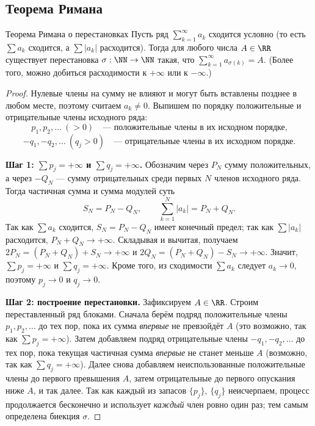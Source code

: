\subsection*{Теорема Римана}

\begin{Theorem}{Теорема Римана о перестановках}{}
	Пусть ряд $\sum_{k=1}^{\infty} a_k$ сходится условно (то есть $\sum a_k$
	сходится, а $\sum|a_k|$ расходится). Тогда для любого числа $A\in\RR$
	существует перестановка $\sigma:\NN\to\NN$ такая, что
	$\sum_{k=1}^{\infty} a_{\sigma(k)}=A$. (Более того, можно добиться
	расходимости к $+\infty$ или к $-\infty$.)
\end{Theorem}

\begin{proof}
	Нулевые члены на сумму не влияют и могут быть вставлены позднее в любом
	месте, поэтому считаем $a_k\ne0$. Выпишем по порядку положительные и
	отрицательные члены исходного ряда:
	\[
	p_1,p_2,\dots\ (>0)\quad\text{--- положительные члены в их исходном порядке,}
	\]
	\[
	-q_1,-q_2,\dots\ (q_j>0)\quad\text{--- отрицательные члены в их исходном порядке.}
	\]

	\textbf{Шаг 1: $\sum p_j=+\infty$ и $\sum q_j=+\infty$.} Обозначим через
	$P_N$ сумму положительных, а через $-Q_N$ --- сумму отрицательных среди
	первых $N$ членов исходного ряда. Тогда частичная сумма и сумма модулей
	суть
	\[
	S_N=P_N-Q_N,\qquad \sum_{k=1}^{N}|a_k|=P_N+Q_N.
	\]
	Так как $\sum a_k$ сходится, $S_N=P_N-Q_N$ имеет конечный предел; так как
	$\sum|a_k|$ расходится, $P_N+Q_N\to+\infty$. Складывая и вычитая, получаем
	$2P_N=(P_N+Q_N)+S_N\to+\infty$ и $2Q_N=(P_N+Q_N)-S_N\to+\infty$. Значит,
	$\sum p_j=+\infty$ и $\sum q_j=+\infty$. Кроме того, из сходимости $\sum a_k$
	следует $a_k\to0$, поэтому $p_j\to0$ и $q_j\to0$.

	\textbf{Шаг 2: построение перестановки.} Зафиксируем $A\in\RR$. Строим
	переставленный ряд блоками. Сначала берём подряд положительные члены
	$p_1,p_2,\dots$ до тех пор, пока их сумма \emph{впервые} не превзойдёт $A$
	(это возможно, так как $\sum p_j=+\infty$). Затем добавляем подряд
	отрицательные члены $-q_1,-q_2,\dots$ до тех пор, пока текущая частичная
	сумма \emph{впервые} не станет меньше $A$ (возможно, так как
	$\sum q_j=+\infty$). Далее снова добавляем неиспользованные положительные
	члены до первого превышения $A$, затем отрицательные до первого опускания
	ниже $A$, и так далее. Так как каждый из запасов $\{p_j\}$, $\{q_j\}$
	неисчерпаем, процесс продолжается бесконечно и использует \emph{каждый}
	член ровно один раз; тем самым определена биекция $\sigma$.


\end{proof}
